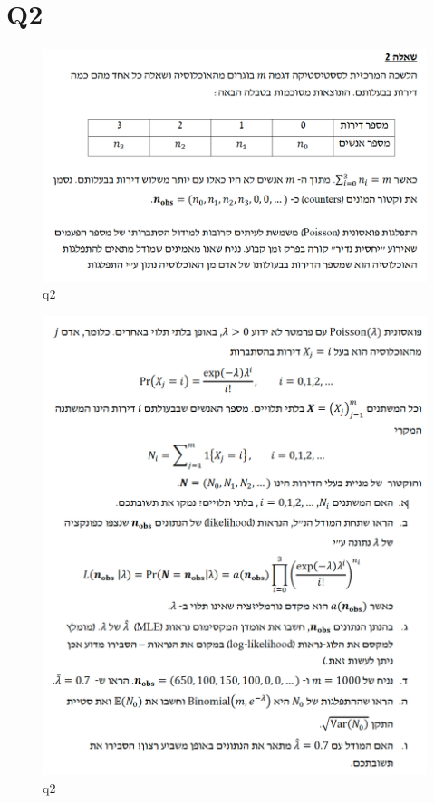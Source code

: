 \newpage

\section{Q2}


\begin{figure}[htbp]
    \centering
    \includegraphics[width=0.48\linewidth]{images/q21.png}
    \caption{q2}
    \label{fig:q21}
\end{figure}

\begin{figure}[htbp]
    \centering
    \includegraphics[width=0.48\linewidth]{images/q22.png}
    \caption{q2}
    \label{fig:q22}
\end{figure}